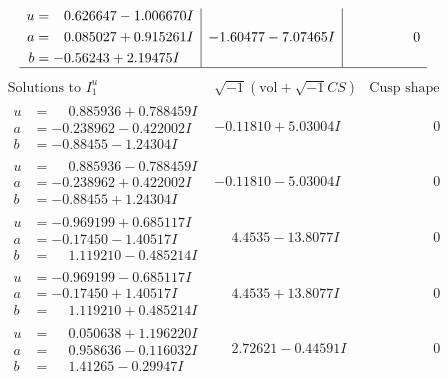 \documentclass[1p]{elsarticle_modified}
\theoremstyle{definition}
\newcommand{\I}{\sqrt{-1}}
\begin{document}
$$\begin{array}{c|c|c}
\begin{aligned}
u &= \phantom{-}0.626647 - 1.006670 I \\
a &= \phantom{-}0.085027 + 0.915261 I \\
b &= -0.56243 + 2.19475 I\end{aligned}
 & -1.60477 - 7.07465 I & \phantom{-0.000000 } 0\\
 \hline 
 \end{array}$$\newpage$$\begin{array}{c|c|c}  
\text{Solutions to }I^u_{1}& \I (\text{vol} + \sqrt{-1}CS) & \text{Cusp shape}\\
 \hline 
\begin{aligned}
u &= \phantom{-}0.885936 + 0.788459 I \\
a &= -0.238962 - 0.422002 I \\
b &= -0.88455 - 1.24304 I\end{aligned}
 & -0.11810 + 5.03004 I & \phantom{-0.000000 } 0 \\ \hline\begin{aligned}
u &= \phantom{-}0.885936 - 0.788459 I \\
a &= -0.238962 + 0.422002 I \\
b &= -0.88455 + 1.24304 I\end{aligned}
 & -0.11810 - 5.03004 I & \phantom{-0.000000 } 0 \\ \hline\begin{aligned}
u &= -0.969199 + 0.685117 I \\
a &= -0.17450 - 1.40517 I \\
b &= \phantom{-}1.119210 - 0.485214 I\end{aligned}
 & \phantom{-}4.4535 - 13.8077 I & \phantom{-0.000000 } 0 \\ \hline\begin{aligned}
u &= -0.969199 - 0.685117 I \\
a &= -0.17450 + 1.40517 I \\
b &= \phantom{-}1.119210 + 0.485214 I\end{aligned}
 & \phantom{-}4.4535 + 13.8077 I & \phantom{-0.000000 } 0 \\ \hline\begin{aligned}
u &= \phantom{-}0.050638 + 1.196220 I \\
a &= \phantom{-}0.958636 - 0.116032 I \\
b &= \phantom{-}1.41265 - 0.29947 I\end{aligned}
 & \phantom{-}2.72621 - 0.44591 I & \phantom{-0.000000 } 0 \\ \hline\begin{aligned}

\end{aligned}
\end{array}$$
\end{document}
